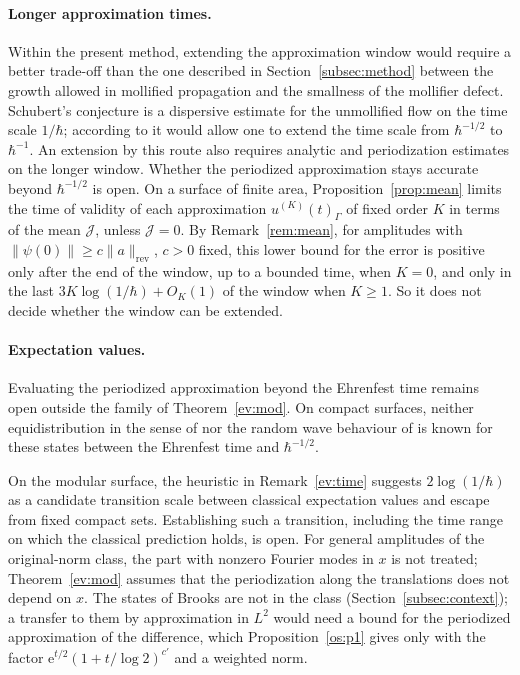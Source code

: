 \documentclass[twoside,10pt]{article}
\numberwithin{equation}{section}
\theoremstyle{slbody}
\theoremstyle{remark}
\newcommand{\norm}[1]{\lVert #1\rVert}
\newcommand{\ue}{\mathrm{e}}
\newcommand{\swNorm}[1]{\norm{#1}_{\mathrm{rev}}}
\begin{document}
\paragraph{Longer approximation times.} Within the present method, extending the approximation window would require a better trade-off than the one described in Section~\ref{subsec:method}
between the growth allowed in mollified propagation and the smallness of the mollifier defect.
Schubert's conjecture \cite[Conjecture~1]{S} is a dispersive estimate for the unmollified flow on the
time scale $1/\hbar$; according to \cite{S} it would allow one to extend the time scale from $\hbar^{-1/2}$ to $\hbar^{-1}$.
An extension by this route also requires analytic and periodization estimates on the longer window.
Whether the periodized approximation stays accurate beyond
$\hbar^{-1/2}$ is open. On a surface of finite area, Proposition~\ref{prop:mean} limits the time of validity of each
approximation $u^{(K)}(t)_\Gamma$ of fixed order $K$ in terms of the mean $\mathcal J$, unless $\mathcal J=0$. By
Remark~\ref{rem:mean}, for amplitudes with $\norm{\psi(0)}\ge c\swNorm a$, $c>0$ fixed, this lower bound for the error is positive
only after the end of the window, up to a bounded time, when $K=0$, and only in the last $3K\log(1/\hbar)+O_K(1)$ of the window when
$K\ge1$. So it does not decide whether the window can be extended.

\paragraph{Expectation values.} Evaluating the periodized approximation beyond the Ehrenfest time remains open outside the family of Theorem~\ref{ev:mod}.
On compact surfaces, neither equidistribution in the sense of \cite{Sch05} nor the random wave behaviour of \cite{Ber77,BB79,IR22} is
known for these states between the Ehrenfest time and $\hbar^{-1/2}$.

On the modular surface, the heuristic in Remark~\ref{ev:time} suggests $2\log(1/\hbar)$ as a candidate transition scale between classical expectation values and escape from fixed compact sets. Establishing such a transition, including the time range on which the classical prediction holds, is open. For general amplitudes of the original-norm class, the part with
nonzero Fourier modes in $x$ is not treated; Theorem~\ref{ev:mod} assumes that the periodization along the translations does not
depend on $x$. The states of Brooks \cite{Bro22} are not in the class
(Section~\ref{subsec:context}); a transfer to them by approximation in $L^2$ would need a bound for the periodized
approximation of the difference, which Proposition~\ref{os:p1} gives only with the factor $\ue^{t/2}(1+t/\log2)^{c'}$ and a
weighted norm.
\end{document}
